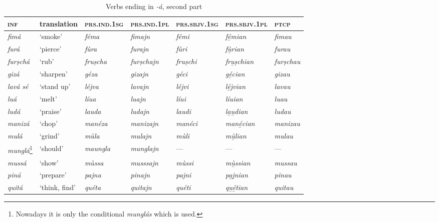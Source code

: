 \begin{sidewaystable}
	\caption{Verbs ending in \textit{-á}, second part}
	\label{stemalta2}
	\begin{tabularx}{\textwidth}{lllllll}
		\lsptoprule
		\textsc{\textbf{inf}} & \textbf{translation} & \textsc{\textbf{prs.ind.1sg}} & \textsc{\textbf{prs.ind.1pl}} & \textsc{\textbf{prs.sbjv.1sg}} & \textsc{\textbf{prs.sbjv.1pl}} &  \textbf{\textsc{ptcp}}\\
		\midrule
		\textit{fimá} & `smoke' & \textit{féma} & \textit{fimajn} & \textit{fémi} & \textit{fé̱mian} & \textit{fimau}\\
		\textit{furá} & ‘pierce’ & \textit{fùra} & \textit{furajn} & \textit{fùri} & \textit{fù̱rian} & \textit{furau}\\
		\textit{furṣchá} & `rub' & \textit{fruṣcha} & \textit{furṣchajn} & \textit{fruṣchi} & \textit{fru̱ṣchian} & \textit{furṣchau}\\
		\textit{gizá} & `sharpen' & \textit{géza} & \textit{gizajn} & \textit{géci} & \textit{gé̱cian} & \textit{gizau}\\
		\textit{lavá sé} & `stand up' & \textit{léjva} & \textit{lavajn} & \textit{léjvi} & \textit{lé̱jvian} & \textit{lavau}\\
		\textit{luá} & `melt' & \textit{líua} & \textit{luajn} & \textit{líui} & \textit{líuian}  & \textit{luau}\\
		\textit{ludá} & `praise' & \textit{lauda} & \textit{ludajn} & \textit{laudi} & \textit{la̱u̱dian} & \textit{ludau}\\
		\textit{manizá} & `chop' & \textit{manéza} & \textit{manizajn} & \textit{manéci} & \textit{mané̱cian} & \textit{manizau}\\
		\textit{mulá} & `grind' & \textit{mùla} & \textit{mulajn} &  \textit{mùli} & \textit{mù̱lian} & \textit{mulau}\\
		\textit{munglá}\footnote{Nowadays it is only the conditional \textit{munglás} which is used.} & ‘should’ & \textit{maungla} & \textit{munglajn} & --- & --- & ---\\
		\textit{mussá} & ‘show’ & \textit{mùssa} & \textit{musssajn} & \textit{mùssi} & \textit{mù̱ssian} & \textit{mussau}\\
		\textit{piná} & `prepare' & \textit{pajna} & \textit{pinajn} & \textit{pajni} & \textit{pa̱j̱nian} & \textit{pinau}\\
		\textit{quitá} & `think, find' & \textit{quéta} & \textit{quitajn} & \textit{quéti} & \textit{qu̱é̱tian} & \textit{quitau}\\

\end{tabularx}
\end{sidewaystable}
